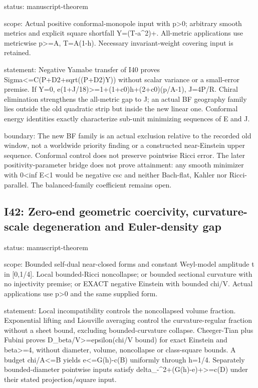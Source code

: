 \documentclass[
  10pt,
]{article}
\begin{document}
status: manuscript-theorem

scope: Actual positive conformal-monopole input with p\textgreater0;
arbitrary smooth metrics and explicit square shortfall Y=(T-a\^{}2)+.
All-metric applications use metricwise p\textgreater=A, T=A(1-h).
Necessary invariant-weight covering input is retained.

statement: Negative Yamabe transfer of I40 proves
Sigma\textless=C(P+D2+sqrt((P+D2)Y)) without scalar variance or a
small-error premise. If Y=0,
e(1+J/18)\textgreater=1+(1+c0)h+(2+c0)(p/A-1), J=4P/R. Chiral
elimination strengthens the all-metric gap to J; an actual BF geography
family lies outside the old quadratic strip but inside the new linear
one. Conformal energy identities exactly characterize sub-unit
minimizing sequences of E and J.

boundary: The new BF family is an actual exclusion relative to the
recorded old window, not a worldwide priority finding or a constructed
near-Einstein upper sequence. Conformal control does not preserve
pointwise Ricci error. The later positivity-parameter bridge does not
prove attainment: any smooth minimizer with 0\textless inf E\textless1
would be negative csc and neither Bach-flat, Kahler nor Ricci-parallel.
The balanced-family coefficient remains open.

\hypertarget{i42-zero-end-geometric-coercivity-curvature-scale-degeneration-and-euler-density-gap}{%
\subsection{I42: Zero-end geometric coercivity, curvature-scale
degeneration and Euler-density
gap}\label{i42-zero-end-geometric-coercivity-curvature-scale-degeneration-and-euler-density-gap}}

status: manuscript-theorem

scope: Bounded self-dual near-closed forms and constant Weyl-model
amplitude t in {[}0,1/4{]}. Local bounded-Ricci noncollapse; or bounded
sectional curvature with no injectivity premise; or EXACT negative
Einstein with bounded chi/V. Actual applications use p\textgreater0 and
the same supplied form.

statement: Local incompatibility controls the noncollapsed volume
fraction. Exponential lifting and Liouville averaging control the
curvature-regular fraction without a sheet bound, excluding
bounded-curvature collapse. Cheeger-Tian plus Fubini proves
D\_beta/V\textgreater=epsilon(chi/V bound) for exact Einstein and
beta\textgreater=4, without diameter, volume, noncollapse or
class-square bounds. A budget chi/A\textless=B yields
e\textless=G(h)-c(B) uniformly through h=1/4. Separately
bounded-diameter pointwise inputs satisfy
delta\_-\^{}2+(G(h)-e)+\textgreater=c(D) under their stated
projection/square input.
\end{document}
